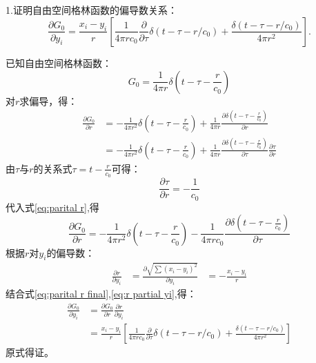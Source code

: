 \subsection*{}
\vskip -1cm
\noindent 1.证明自由空间格林函数的偏导数关系：
$$\frac{\partial G_{0}}{\partial y_{i}}=
\frac{x_{i}-y_{i}}{r}\left[\frac{1}{4 \pi r c_{0}} \frac{\partial}{\partial \tau} \delta\left(t-\tau-r / c_{0}\right)+
\frac{\delta\left(t-\tau-r / c_{0}\right)}{4 \pi r^{2}}\right].$$

\noindent 已知自由空间格林函数：
\begin{equation}
    G_{0}=\frac{1}{4 \pi r} \delta\left(t-\tau-\frac{r}{c_{0}}\right)     
\end{equation}
对$r$求偏导，得：
\begin{equation}
    \begin{aligned}
        \label{eq:parital r}
        \frac{\partial G_{0}}{\partial r} &= -\frac{1}{4 \pi r^{2}} \delta\left(t-\tau-\frac{r}{c_{0}}\right)+\frac{1}{4 \pi r} \frac{\partial \delta\left(t-\tau -\frac{r}{c_{0}}\right)}{\partial r} \\
        &= -\frac{1}{4 \pi r^{2}} \delta\left(t-\tau-\frac{r}{c_{0}}\right)+\frac{1}{4 \pi r} \frac{\partial \delta\left(t-\tau -\frac{r}{c_{0}}\right)}{\partial \tau} \frac{\partial \tau}{\partial r}   
    \end{aligned}
\end{equation}
由$ \tau $与$ r $的关系式$ \tau = t - \frac{r}{c_{0}} $可得：
\begin{equation}
    \frac{\partial \tau}{\partial r} = - \frac{1}{c_{0}}
\end{equation} 
代入式\eqref{eq:parital r},得
\begin{equation}
    \label{eq:parital r final}
    \frac{\partial G_{0}}{\partial r} = -\frac{1}{4 \pi r^{2}} \delta\left(t-\tau-\frac{r}{c_{0}}\right)-\frac{1}{4 \pi r c_{0}} \frac{\partial \delta\left(t-\tau -\frac{r}{c_{0}}\right)}{\partial \tau}
\end{equation}
根据$r$对$y_{i}$的偏导数：
\begin{equation}
    \label{eq:r partial yi}
    \begin{aligned}
        \frac{\partial r}{\partial y_{i}} &=  \frac{\partial \sqrt{\sum (x_{i} - y_{i})^2}}{\partial y_{i}}
        &= - \frac{x_{i} - y_{i}}{r}
    \end{aligned}
\end{equation}
结合式\eqref{eq:parital r final},\eqref{eq:r partial yi},得：
\begin{equation}
    \label{eq:G0 partial yi}
    \begin{aligned}
        \frac{\partial G_{0}}{\partial y_{i}} &= \frac{\partial G_{0}}{\partial r} \frac{\partial r}{\partial y_{i}} \\
        &= \frac{x_{i}-y_{i}}{r}\left[\frac{1}{4 \pi r c_{0}} \frac{\partial}{\partial \tau} \delta\left(t-\tau-r / c_{0}\right)+
            \frac{\delta\left(t-\tau-r / c_{0}\right)}{4 \pi r^{2}}\right]
    \end{aligned}
\end{equation}
原式得证。

